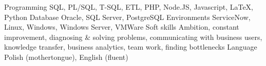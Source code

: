 \begin{cvskills}
	\cvskill
		{Programming}
		{SQL, PL/SQL, T-SQL, ETL, PHP, Node.JS, Javascript, \LaTeX, Python}
	\cvskill
		{Database}
		{Oracle, SQL Server, PostgreSQL}
	\cvskill
		{Environments}
		{ServiceNow, Linux, Windows, Windows Server, VMWare}
	\cvskill
		{Soft skills}
		{Ambition, constant improvement, diagnosing \& solving problems, communicating with business users, knowledge transfer, business analytics, team work, finding bottlenecks}
	\cvskill
		{Language}
		{Polish (mothertongue), English (fluent)}
\end{cvskills}
